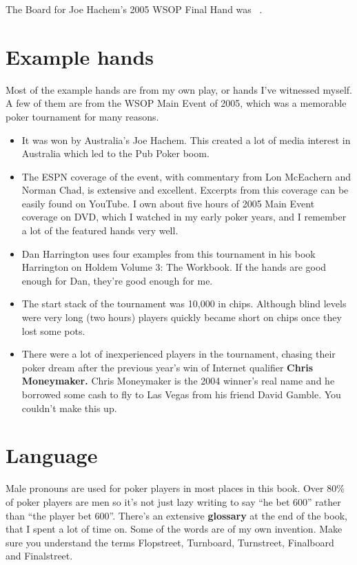 The Board for Joe Hachem's 2005 WSOP Final Hand was
\sixh\fived\fourd\As\fourc\ .

\section*{Example hands}

Most of the example hands are from my own play, or hands I've
witnessed myself. A few of them are from the WSOP Main Event
of 2005, which was a memorable poker tournament for many reasons.

\begin{itemize}
  \item It was won by Australia's Joe Hachem. This created a lot of
    media interest in Australia which led to the Pub Poker boom.
  \item The ESPN coverage of the event, with commentary from
    Lon McEachern and Norman Chad, is extensive and
    excellent. Excerpts from this coverage can be easily found on
    YouTube. I own about five hours of 2005 Main Event coverage on
    DVD, which I watched in my early poker years, and I remember a lot
    of the featured hands very well.
  \item Dan Harrington uses four examples from this tournament in his
    book Harrington on Holdem Volume 3: The Workbook. If the hands are
    good enough for Dan, they're good enough for me.
  \item The start stack of the tournament was 10,000 in
    chips. Although blind levels were very long (two hours)
    players quickly became short on chips once they lost some pots.
  \item There were a lot of inexperienced players in the tournament,
    chasing their poker dream after the previous year's win of
    Internet qualifier \textbf{Chris Moneymaker.} Chris Moneymaker is
    the 2004 winner's real name and he borrowed some cash to fly to
    Las Vegas from his friend David Gamble. You couldn't make this up.

\end{itemize}


\section{Language}

Male pronouns are used for poker players in most places in this
book. Over 80\% of poker players are men so it's not just lazy writing
to say ``he bet 600'' rather than ``the player bet 600''. There's an
extensive \textbf{glossary} at the end of the book, that I spent a lot
of time on. Some of the words are of my own invention. Make sure you
understand the terms Flopstreet, Turnboard, Turnstreet, Finalboard and
Finalstreet.
